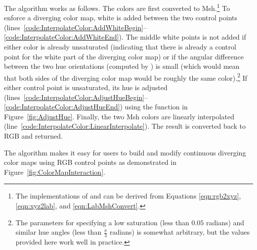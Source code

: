 \documentclass{llncs}
\newcommand{\RGB}{RGB\xspace}
\newcommand{\Msh}{Msh\xspace}
\begin{document}
{The  algorithm works as follows.  The colors are
first converted to \Msh.\footnote{The implementations of  and
 can be derived from Equations \ref{eqn:rgb2xyz},
\ref{eqn:xyz2lab}, and \ref{eqn:LabMshConvert}.}  To enforce
a diverging color map, white is added between the two control points
(lines~\ref{code:InterpolateColor:AddWhiteBegin}--\ref{code:InterpolateColor:AddWhiteEnd}).
The middle white points is not added if either color is already unsaturated
(indicating that there is already a control point for the white part of the
diverging color map) or if the angular difference between the two hue
orientations (computed by ) is small (which would mean that
both sides of the diverging color map would be roughly the same
color).\footnote{The parameters for specifying a low saturation (less than
$0.05$ radians) and similar hue angles (less than $\frac{\pi}{3}$ radians)
is somewhat arbitrary, but the values provided here work well in practice.}
If either control point is unsaturated, its hue is adjusted
(lines~\ref{code:InterpolateColor:AdjustHueBegin}--\ref{code:InterpolateColor:AdjustHueEnd})
using the  function in Figure~\ref{fig:AdjustHue}.
Finally, the two \Msh colors are linearly interpolated
(line~\ref{code:InterpolateColor:LinearInterpolate}).  The result is
converted back to \RGB and returned.

The  algorithm makes it easy for users to build and
modify continuous diverging color maps using \RGB control points as
demonstrated in Figure~\ref{fig:ColorMapInteraction}.

}
\end{document}
